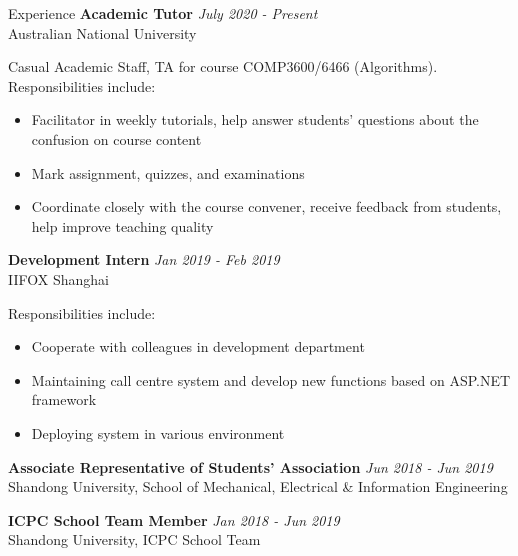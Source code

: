 \documentclass{resume} %
\begin{document}
\begin{rSection}{Experience}
{\bf Academic Tutor} \hfill {\em July 2020 - Present}\\
{Australian National University}

Casual Academic Staff, TA for course COMP3600/6466 (Algorithms). Responsibilities include:
\begin{itemize}
	\item Facilitator in weekly tutorials, help answer students' questions about the confusion on course content
	\item Mark assignment, quizzes, and examinations
	\item Coordinate closely with the course convener, receive feedback from students, help improve teaching quality
\end{itemize}


{\bf Development Intern} \hfill {\em Jan 2019 - Feb 2019}\\
{IIFOX Shanghai}

Responsibilities include:
\begin{itemize}
	\item Cooperate with colleagues in development department
	\item Maintaining call centre system and develop new functions based on ASP.NET framework
	\item Deploying system in various environment
\end{itemize}
 
{\bf Associate Representative of Students' Association} \hfill {\em Jun 2018 - Jun 2019}\\
{Shandong University, School of Mechanical, Electrical \& Information Engineering}

{\bf ICPC School Team Member} \hfill {\em Jan 2018 - Jun 2019}\\
{Shandong University, ICPC School Team}

\end{rSection}
\end{document}

